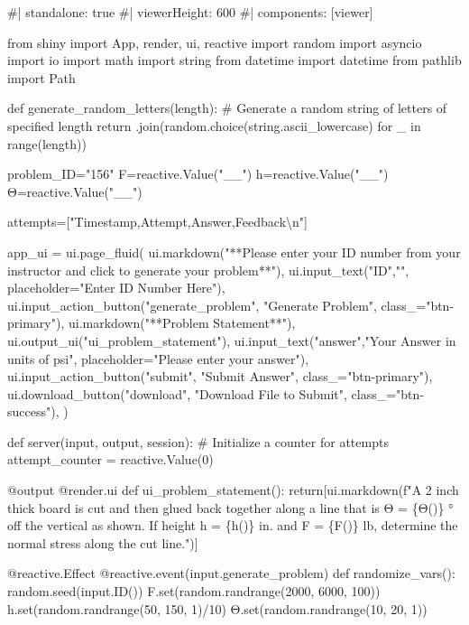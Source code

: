 \documentclass[
  letterpaper,
  DIV=11,
  numbers=noendperiod]{scrreprt}
\newenvironment{Shaded}{\begin{snugshade}}{\end{snugshade}}
\newcommand{\NormalTok}[1]{\textcolor[rgb]{0.00,0.23,0.31}{#1}}
\begin{document}
\begin{Shaded}
\begin{Highlighting}[]
\NormalTok{\#| standalone: true}
\NormalTok{\#| viewerHeight: 600}
\NormalTok{\#| components: [viewer]}

\NormalTok{from shiny import App, render, ui, reactive}
\NormalTok{import random}
\NormalTok{import asyncio}
\NormalTok{import io}
\NormalTok{import math}
\NormalTok{import string}
\NormalTok{from datetime import datetime}
\NormalTok{from pathlib import Path}

\NormalTok{def generate\_random\_letters(length):}
\NormalTok{    \# Generate a random string of letters of specified length}
\NormalTok{    return \textquotesingle{}\textquotesingle{}.join(random.choice(string.ascii\_lowercase) for \_ in range(length))  }

\NormalTok{problem\_ID="156"}
\NormalTok{F=reactive.Value("\_\_")}
\NormalTok{h=reactive.Value("\_\_")}
\NormalTok{Θ=reactive.Value("\_\_")}

\NormalTok{attempts=["Timestamp,Attempt,Answer,Feedback\textbackslash{}n"]}

\NormalTok{app\_ui = ui.page\_fluid(}
\NormalTok{    ui.markdown("**Please enter your ID number from your instructor and click to generate your problem**"),}
\NormalTok{    ui.input\_text("ID","", placeholder="Enter ID Number Here"),}
\NormalTok{    ui.input\_action\_button("generate\_problem", "Generate Problem", class\_="btn{-}primary"),}
\NormalTok{    ui.markdown("**Problem Statement**"),}
\NormalTok{    ui.output\_ui("ui\_problem\_statement"),}
\NormalTok{    ui.input\_text("answer","Your Answer in units of psi", placeholder="Please enter your answer"),}
\NormalTok{    ui.input\_action\_button("submit", "Submit Answer", class\_="btn{-}primary"),}
\NormalTok{    ui.download\_button("download", "Download File to Submit", class\_="btn{-}success"),}
\NormalTok{)}


\NormalTok{def server(input, output, session):}
\NormalTok{    \# Initialize a counter for attempts}
\NormalTok{    attempt\_counter = reactive.Value(0)}

\NormalTok{    @output}
\NormalTok{    @render.ui}
\NormalTok{    def ui\_problem\_statement():}
\NormalTok{        return[ui.markdown(f"A 2 inch thick board is cut and then glued back together along a line that is Θ = \{Θ()\} ° off the vertical as shown. If height h = \{h()\} in. and F = \{F()\} lb, determine the normal stress along the cut line.")]}
    
\NormalTok{    @reactive.Effect}
\NormalTok{    @reactive.event(input.generate\_problem)}
\NormalTok{    def randomize\_vars():}
\NormalTok{        random.seed(input.ID())}
\NormalTok{        F.set(random.randrange(2000, 6000, 100))}
\NormalTok{        h.set(random.randrange(50, 150, 1)/10)}
\NormalTok{        Θ.set(random.randrange(10, 20, 1))}
        


\end{Highlighting}
\end{Shaded}
\end{document}
